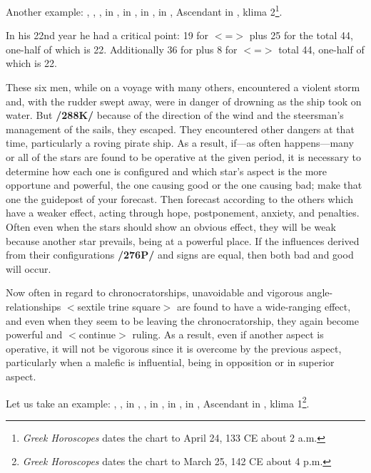Another example: \Sun, \Mercury, \Venus, \Moon\xspace in \Taurus, \Saturn\xspace in \Sagittarius, \Jupiter\xspace in \Scorpio, \Mars\xspace in \Leo, Ascendant in \Pisces, klima 2\footnote{\textit{Greek Horoscopes} dates the chart to  April 24, 133 CE about 2 a.m.}.

In his 22nd year he had a critical point: 19 for \Leo\xspace $<$=\Sun$>$ plus 25 for the \Moon\xspace total 44, one-half of which is 22. Additionally 36 for \Scorpio\xspace plus 8 for \Taurus\xspace $<$=\Venus$>$ total 44, one-half of which is 22.

These six men, while on a voyage with many others, encountered a violent storm and, with the rudder swept away, were in danger of drowning as the ship took on water. But \textbf{/288K/} because of the direction of the wind and the steersman’s management of the sails, they escaped. They encountered other dangers at that time, particularly a roving pirate ship. As a result, if—as often happens—many or all of the stars are found to be operative at the given period,
it is necessary to determine how each one is configured and which star’s aspect is the more opportune and powerful, the one causing good or the one causing bad; make that one the guidepost of your forecast. Then forecast according to the others which have a weaker effect, acting through hope, postponement, anxiety, and penalties.  Often even when the stars should show an obvious effect, they will be weak because another star prevails, being at a powerful place. If the influences derived from their configurations \textbf{/276P/} and signs are equal, then both bad and good will occur. 

Now often in regard to chronocratorships, unavoidable and vigorous angle-relationships $<$sextile trine square$>$ are found to have a wide-ranging effect, and even when they seem to be leaving the chronocratorship, they again become powerful and $<$continue$>$ ruling. As a result, even if another aspect is operative, it will not be vigorous since it is overcome by the previous aspect, particularly when a malefic is influential, being in opposition or in superior aspect.

Let us take an example: \Sun, \Saturn, \Mercury\xspace in \Aries, \Moon, \Jupiter\xspace in \Leo, \Mars\xspace in \Taurus, \Venus\xspace in \Aquarius, Ascendant in \Virgo, klima 1\footnote{\textit{Greek Horoscopes} dates the chart to March 25, 142 CE about 4 p.m.}.


